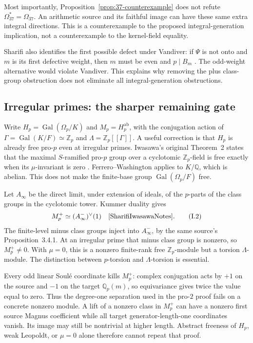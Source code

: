 Most importantly, Proposition~\ref{prop:37-counterexample} does not refute $\Omega_{37}^*=\Omega_{37}$. An arithmetic source and its faithful image can have these same extra integral directions. This is a counterexample to the proposed integral-generation implication, not a counterexample to the kernel-field equality.

Sharifi also identifies the first possible defect under Vandiver: if $\Psi$ is not onto and $m$ is its first defective weight, then $m$ must be even and $p\mid B_m$ \cite[Theorem~4.1, p.~10]{Sharifi2002}. The odd-weight alternative would violate Vandiver. This explains why removing the plus class-group obstruction does not eliminate all integral-generation obstructions.

\subsection{Irregular primes: the sharper remaining gate}
\label{sec:irregular-gate}

Write $H_p=\operatorname{Gal}(\Omega_p/K)$ and $M_p=H_p^{\mathrm{ab}}$, with the conjugation action of $\Gamma=\operatorname{Gal}(K/F)\simeq\mathbb Z_p$ and $\Lambda=\mathbb Z_p[[\Gamma]]$. A useful correction is that $H_p$ is already free pro-$p$ even at irregular primes. Iwasawa's original Theorem~2 states that the maximal $S$-ramified pro-$p$ group over a cyclotomic $\mathbb Z_p$-field is free exactly when its $\mu$-invariant is zero \cite[pp.~273--274]{Iwasawa1981}. Ferrero--Washington applies to $K/\mathbb Q$, which is abelian. This does not make the finite-base group $\operatorname{Gal}(\Omega_p/F)$ free.

Let $A_\infty$ be the direct limit, under extension of ideals, of the $p$-parts of the class groups in the cyclotomic tower. Kummer duality gives
\[
 M_p^+\simeq(A_\infty^-)^\vee(1)
 \quad\cite[Corollary~3.3.14 and Proposition~3.4.7]{SharifiIwasawaNotes}.
                                                               \tag{I.2}
\]
The finite-level minus class groups inject into $A_\infty^-$, by the same source's Proposition~3.4.1. At an irregular prime that minus class group is nonzero, so $M_p^+\neq0$. With $\mu=0$, this is a nonzero finite-rank free $\mathbb Z_p$-module but a torsion $\Lambda$-module. The distinction between $p$-torsion and $\Lambda$-torsion is essential.

Every odd linear Soul\'e coordinate kills $M_p^+$: complex conjugation acts by $+1$ on the source and $-1$ on the target $\mathbb Q_p(m)$, so equivariance gives twice the value equal to zero. Thus the degree-one separation used in the pro-$2$ proof fails on a concrete nonzero module. A lift of a nonzero class in $M_p^+$ can have a nonzero first source Magnus coefficient while all target generator-length-one coordinates vanish. Its image may still be nontrivial at higher length. Abstract freeness of $H_p$, weak Leopoldt, or $\mu=0$ alone therefore cannot repeat that proof.

